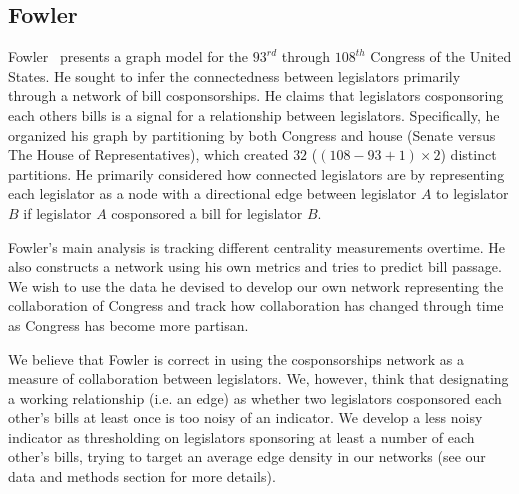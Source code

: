 \subsection{Fowler}

Fowler~\cite{Fowler} presents a graph model for the $93^{rd}$ through $108^{th}$
Congress of the United  States. He sought to infer the connectedness between
legislators primarily  through a network of bill cosponsorships. He claims that
legislators  cosponsoring each others bills is a signal for a relationship
between legislators. Specifically, he organized his graph by partitioning by
both Congress and house  (Senate versus The House of Representatives), which
created $32$  ($(108 - 93 + 1) \times 2$) distinct partitions. He primarily
considered how  connected legislators are by representing each legislator as a
node with a  directional edge between legislator $A$ to legislator $B$ if
legislator $A$  cosponsored a bill for legislator $B$.

Fowler's main analysis is tracking different centrality measurements overtime.
He also constructs a network using his own metrics and tries to predict bill
passage. We wish to use the data he devised to develop our own network
representing the collaboration of Congress and track how collaboration has
changed through time as Congress has become more partisan.

We believe that Fowler is correct in using the cosponsorships network as a
measure of collaboration between legislators. We, however, think that 
designating a working relationship (i.e. an edge) as whether two legislators
cosponsored each other's bills at least once is too noisy of an indicator. We
develop a less noisy indicator as thresholding on legislators sponsoring at
least a number of each other's bills, trying to target an average edge density
in our networks (see our data and methods section for more details).
